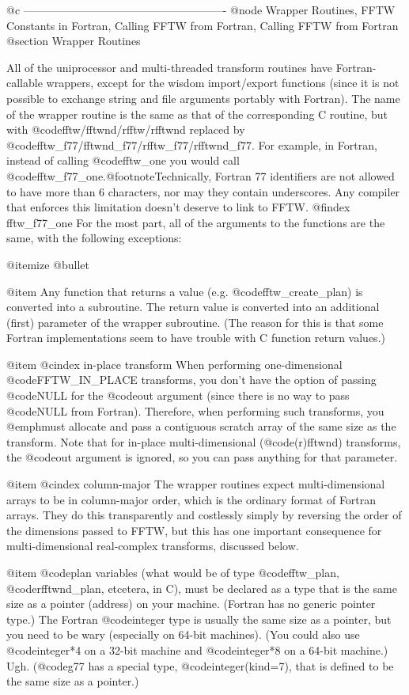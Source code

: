 @c -------------------------------------------------------
@node Wrapper Routines, FFTW Constants in Fortran, Calling FFTW from Fortran, Calling FFTW from Fortran
@section Wrapper Routines

All of the uniprocessor and multi-threaded transform routines have
Fortran-callable wrappers, except for the wisdom import/export functions
(since it is not possible to exchange string and file arguments portably
with Fortran).  The name of the wrapper routine is the same as that of
the corresponding C routine, but with @code{fftw/fftwnd/rfftw/rfftwnd}
replaced by @code{fftw_f77/fftwnd_f77/rfftw_f77/rfftwnd_f77}.  For
example, in Fortran, instead of calling @code{fftw_one} you would call
@code{fftw_f77_one}.@footnote{Technically, Fortran 77 identifiers are
not allowed to have more than 6 characters, nor may they contain
underscores.  Any compiler that enforces this limitation doesn't deserve
to link to FFTW.}
@findex fftw_f77_one
For the most part, all of the arguments to the functions are the same,
with the following exceptions:

@itemize @bullet

@item
Any function that returns a value (e.g. @code{fftw_create_plan}) is
converted into a subroutine.  The return value is converted into an
additional (first) parameter of the wrapper subroutine.  (The reason for
this is that some Fortran implementations seem to have trouble with C
function return values.)

@item
@cindex in-place transform
When performing one-dimensional @code{FFTW_IN_PLACE} transforms, you
don't have the option of passing @code{NULL} for the @code{out} argument
(since there is no way to pass @code{NULL} from Fortran).  Therefore,
when performing such transforms, you @emph{must} allocate and pass a
contiguous scratch array of the same size as the transform.  Note that
for in-place multi-dimensional (@code{(r)fftwnd}) transforms, the
@code{out} argument is ignored, so you can pass anything for that
parameter.

@item
@cindex column-major
The wrapper routines expect multi-dimensional arrays to be in
column-major order, which is the ordinary format of Fortran arrays.
They do this transparently and costlessly simply by reversing the order
of the dimensions passed to FFTW, but this has one important consequence
for multi-dimensional real-complex transforms, discussed below.

@item
@code{plan} variables (what would be of type @code{fftw_plan},
@code{rfftwnd_plan}, etcetera, in C), must be declared as a type that is
the same size as a pointer (address) on your machine.  (Fortran has no
generic pointer type.)  The Fortran @code{integer} type is usually the
same size as a pointer, but you need to be wary (especially on 64-bit
machines).  (You could also use @code{integer*4} on a 32-bit machine and
@code{integer*8} on a 64-bit machine.)  Ugh.  (@code{g77} has a special
type, @code{integer(kind=7)}, that is defined to be the same size as a
pointer.)


